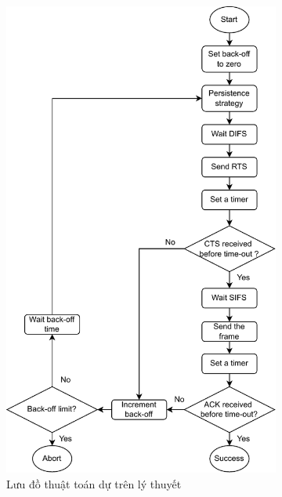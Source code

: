 \begin{figure}[h]
    \centering
    \begin{subfigure}[h]{0.45\linewidth}
        \centering
        \includegraphics[width=1.13\linewidth]{figures/Chapter2/flowchart_k2opt.pdf}
        \caption{Lưu đồ thuật toán dự trên lý thuyết}
        \label{fig:flowchart}
    \end{subfigure}
    \hspace{0.05\linewidth} %
    \begin{subfigure}[h]{0.45\linewidth}

\end{subfigure}
\end{figure}

